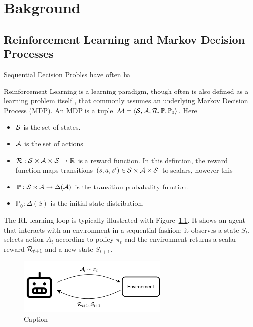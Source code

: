 \chapter{Bakground}



\section{Reinforcement Learning and Markov Decision Processes}

Sequential Decision Probles have often ha

Reinforcement Learning is a learning paradigm, though often is also defined as a learning problem itself \citep{Todorov2006}, that commonly assumes an underlying Markov Decision Process (MDP). An MDP is a tuple ${\mathcal{M} = \langle\mathcal{S},\mathcal{A},\mathcal{R},\mathbb{P},\mathbb{P}_0\rangle}$. Here
\begin{itemize}
    \item $\mathcal{S}$ is the set of states.
    \item $\mathcal{A}$ is the set of actions.
    \item $\mathcal{R}:\mathcal{S}\times\mathcal{A}\times\mathcal{S}\rightarrow\mathbb{R}$ is a reward function. In this defintion, the reward function maps transitions $(s, a, s')\in\mathcal{S}\times\mathcal{A}\times\mathcal{S}$ to scalars, however this 
    \item $\mathbb{P}:\mathcal{S}\times\mathcal{A}\rightarrow\Delta(\mathcal{A})$ is the transition probabality function.
    \item $\mathbb{P_0}:\Delta(S)$ is the initial state distribution.
\end{itemize}
The RL learning loop is typically illustrated with Figure~\ref{fig:rl_loop}. It shows an agent that interacts with an environment in a sequential fashion: it observes a state $S_t$, selects action $A_t$ according to policy $\pi_t$ and the environment returns a scalar reward $\mathcal{R}_{t+1}$ and a new state $S_{t+1}$.


\begin{figure}
    \centering
\includegraphics[width=0.65\textwidth]{figures/RL_loop.png}
    \caption{Caption}
    \label{fig:rl_loop}
\end{figure}


